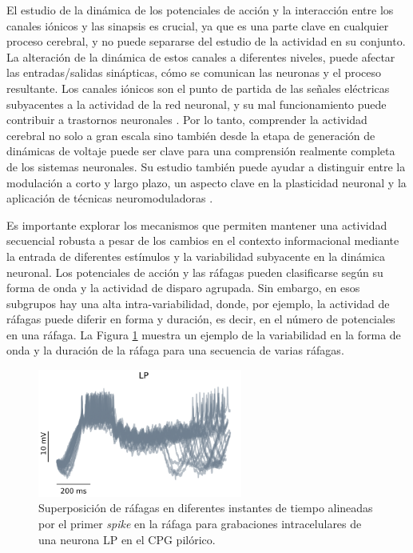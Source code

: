 El estudio de la dinámica de los potenciales de acción y la interacción entre los canales iónicos y las sinapsis es crucial, ya que es una parte clave en cualquier proceso cerebral, y no puede separarse del estudio de la actividad en su conjunto. La alteración de la dinámica de estos canales a diferentes niveles, puede afectar las entradas/salidas sinápticas, cómo se comunican las neuronas y el proceso resultante. Los canales iónicos son el punto de partida de las señales eléctricas subyacentes a la actividad de la red neuronal, y su mal funcionamiento puede contribuir a trastornos neuronales \parencite{kecskes_editorial_2023}. Por lo tanto, comprender la actividad cerebral no solo a gran escala sino también desde la etapa de generación de dinámicas de voltaje puede ser clave para una comprensión realmente completa de los sistemas neuronales. Su estudio también puede ayudar a distinguir entre la modulación a corto y largo plazo, un aspecto clave en la plasticidad neuronal y la aplicación de técnicas neuromoduladoras \parencite{chambers_lightactivated_2008,burke_modulation_2019}.

Es importante explorar los mecanismos que permiten mantener una actividad secuencial robusta a pesar de los cambios en el contexto informacional mediante la entrada de diferentes estímulos y la variabilidad subyacente en la dinámica neuronal. Los potenciales de acción y las ráfagas pueden clasificarse según su forma de onda y la actividad de disparo agrupada. Sin embargo, en esos subgrupos hay una alta intra-variabilidad, donde, por ejemplo, la actividad de ráfagas puede diferir en forma y duración, es decir, en el número de potenciales en una ráfaga. La Figura \ref{fig:burst variability spanish} muestra un ejemplo de la variabilidad en la forma de onda y la duración de la ráfaga para una secuencia de varias ráfagas.

\begin{figure}[htb!]
	\centering
	\includegraphics[width=0.6\textwidth]{img/intro/burst_variability.png}
	\caption{Superposición de ráfagas en diferentes instantes de tiempo alineadas por el primer \textit{spike} en la ráfaga para grabaciones intracelulares de una neurona LP en el CPG pilórico.}
	\label{fig:burst variability spanish}
\end{figure}

